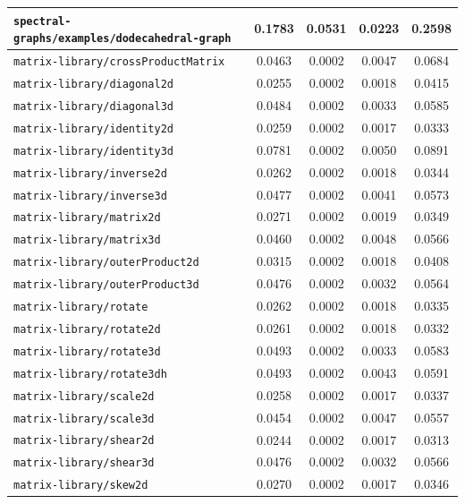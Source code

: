 \begin{longtable}{|p{6.5cm}|c|c|c|c|}
    \texttt{spectral-graphs/examples/dodecahedral-graph} & 0.1783 & 0.0531 & 0.0223 & 0.2598 \\ \hline
    \texttt{matrix-library/crossProductMatrix} & 0.0463 & 0.0002 & 0.0047 & 0.0684 \\ \hline
    \texttt{matrix-library/diagonal2d} & 0.0255 & 0.0002 & 0.0018 & 0.0415 \\ \hline
    \texttt{matrix-library/diagonal3d} & 0.0484 & 0.0002 & 0.0033 & 0.0585 \\ \hline
    \texttt{matrix-library/identity2d} & 0.0259 & 0.0002 & 0.0017 & 0.0333 \\ \hline
    \texttt{matrix-library/identity3d} & 0.0781 & 0.0002 & 0.0050 & 0.0891 \\ \hline
    \texttt{matrix-library/inverse2d} & 0.0262 & 0.0002 & 0.0018 & 0.0344 \\ \hline
    \texttt{matrix-library/inverse3d} & 0.0477 & 0.0002 & 0.0041 & 0.0573 \\ \hline
    \texttt{matrix-library/matrix2d} & 0.0271 & 0.0002 & 0.0019 & 0.0349 \\ \hline
    \texttt{matrix-library/matrix3d} & 0.0460 & 0.0002 & 0.0048 & 0.0566 \\ \hline
    \texttt{matrix-library/outerProduct2d} & 0.0315 & 0.0002 & 0.0018 & 0.0408 \\ \hline
    \texttt{matrix-library/outerProduct3d} & 0.0476 & 0.0002 & 0.0032 & 0.0564 \\ \hline
    \texttt{matrix-library/rotate} & 0.0262 & 0.0002 & 0.0018 & 0.0335 \\ \hline
    \texttt{matrix-library/rotate2d} & 0.0261 & 0.0002 & 0.0018 & 0.0332 \\ \hline
    \texttt{matrix-library/rotate3d} & 0.0493 & 0.0002 & 0.0033 & 0.0583 \\ \hline
    \texttt{matrix-library/rotate3dh} & 0.0493 & 0.0002 & 0.0043 & 0.0591 \\ \hline
    \texttt{matrix-library/scale2d} & 0.0258 & 0.0002 & 0.0017 & 0.0337 \\ \hline
    \texttt{matrix-library/scale3d} & 0.0454 & 0.0002 & 0.0047 & 0.0557 \\ \hline
    \texttt{matrix-library/shear2d} & 0.0244 & 0.0002 & 0.0017 & 0.0313 \\ \hline
    \texttt{matrix-library/shear3d} & 0.0476 & 0.0002 & 0.0032 & 0.0566 \\ \hline
    \texttt{matrix-library/skew2d} & 0.0270 & 0.0002 & 0.0017 & 0.0346 \\ \hline

\end{longtable}
